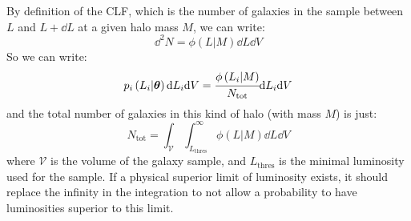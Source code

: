 By definition of the CLF, which is the number of galaxies in the sample between
$L$ and $L+\dd L$ at a given halo mass $M$, we can write:
%
\begin{equation}
    \dd^2 N=\phi\left(L|M\right)\dd L \dd V
\end{equation}
%
So we can write:
%
\begin{equation}
    p_i\left(L_i|{\boldsymbol\theta}\right){\rm{d}} L_i{\rm{d}} V =
    \cfrac{\phi\left(L_i|M\right)}{N_\mathrm{tot}}{\rm{d}} L_i{\rm{d}} V
\end{equation}
%
and the total number of galaxies in this kind of halo (with mass $M$) is just:
%
\begin{equation}
    N_\mathrm{tot}=\int_\mathcal{V}\int_{L_\mathrm{thres}}^\infty
    \phi\left(L|M\right)\dd L\dd V
\end{equation}
%
where $\mathcal{V}$ is the volume of the galaxy sample, and $L_\mathrm{thres}$
is the minimal luminosity used for the sample. If a physical superior limit of
luminosity exists, it should replace the infinity in the integration to not
allow a probability to have luminosities superior to this limit.

